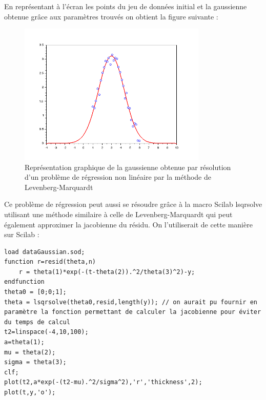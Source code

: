       En représentant à l'écran les points du jeu de données initial et la gaussienne obtenue grâce aux paramètres trouvés on obtient la figure suivante :
      \begin{figure}[H]
              \centering
                \includegraphics[width=0.8\textwidth]{images/reg_non_lin.png}
              \caption{Représentation graphique de la gaussienne obtenue par résolution d'un problème de régression non linéaire par la méthode de Levenberg-Marquardt}
              \label{fig:renl1}
            \end{figure}
   Ce problème de régression peut aussi se résoudre grâce à la macro Scilab lsqrsolve utilisant une méthode similaire à celle de Levenberg-Marquardt qui peut également approximer la jacobienne du résidu. On l'utiliserait de cette manière sur Scilab :
   \begin{center}
          \begin{verbatim}
load dataGaussian.sod;
function r=resid(theta,n)
    r = theta(1)*exp(-(t-theta(2)).^2/theta(3)^2)-y;
endfunction
theta0 = [0;0;1];
theta = lsqrsolve(theta0,resid,length(y)); // on aurait pu fournir en paramètre la fonction permettant de calculer la jacobienne pour éviter du temps de calcul
t2=linspace(-4,10,100);
a=theta(1);
mu = theta(2);
sigma = theta(3);
clf;
plot(t2,a*exp(-(t2-mu).^2/sigma^2),'r','thickness',2);
plot(t,y,'o');
          \end{verbatim}
                \label{lst:code_15}
         \end{center}
